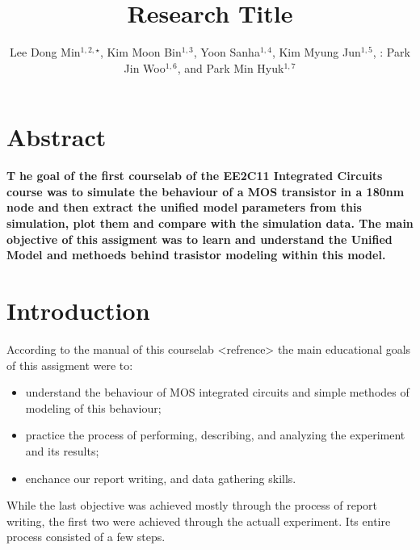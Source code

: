 \documentclass[	DIV=calc,%
							paper=a4,%
							fontsize=12pt,%
							twocolumn]{scrartcl}	 					%
\title{Research Title}					%
\author{Lee Dong Min$^{1, 2,\star}$, Kim Moon Bin$^{1,3}$, Yoon Sanha$^{1,4}$, \newline Kim Myung Jun$^{1,5}$, : Park Jin Woo$^{1,6}$, and Park Min Hyuk$^{1,7}$ }											%
\date{}																%
\newcommand{\initial}[1]{%
     \lettrine[lines=3,lhang=0.3,nindent=0em]{
     				\color{DarkBlue}
     				{\textsf{#1}}}{}}
\begin{document}
\maketitle
\thispagestyle{fancy} 			%
\section*{Abstract}
\initial{\textbf{T}}\textbf{
	he goal of the first courselab of the EE2C11 Integrated Circuits course was to simulate the behaviour of a MOS transistor in a 180nm node and then extract the unified model parameters from this simulation, plot them and compare with the simulation data. The main objective of this assigment was to learn and understand the Unified Model and methoeds behind trasistor modeling within this model. }

\section*{Introduction}
\; \; %
According to the manual of this courselab <refrence> the main educational goals of this assigment were to:
\begin{itemize}
	\item understand the behaviour of MOS integrated circuits and simple methodes of modeling of this behaviour;
	\item practice the process of performing, describing, and analyzing the experiment and its results;
	\item enchance our report writing, and data gathering skills.
\end{itemize}

While the last objective was achieved mostly through the process of report writing, the first two were achieved through the actuall experiment. Its entire process consisted of a few steps.
\end{document}
